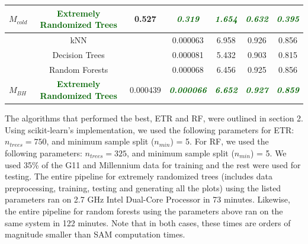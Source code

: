\documentclass[a4paper,fleqn,usenatbib]{mnras}
\begin{document}
\begin{table}
\begin{minipage}{159mm}
\begin{tabular}{@{}lcccccc}
  \multirow{-5}{*}{$M_{cold}$} & \textcolor{darkgreen}{\textbf{Extremely Randomized Trees}} & \multirow{-5}{*}{0.527} & \textcolor{darkgreen}{\textbf{\textit{0.319}}} & \textcolor{darkgreen}{\textbf{\textit{1.654}}} & \textcolor{darkgreen}{\textbf{\textit{0.632}}} & \textcolor{darkgreen}{\textbf{\textit{0.395}}} \\
 \hline
 & kNN & & 0.000063 & 6.958 & 0.926 & 0.856 \\
  & Decision Trees &  & 0.000081 & 5.432 & 0.903 & 0.815 \\
  & Random Forests &  & 0.000068 & 6.456 & 0.925 & 0.856 \\
  \multirow{-5}{*}{$M_{BH}$} & \textcolor{darkgreen}{\textbf{Extremely Randomized Trees}} & \multirow{-5}{*}{0.000439} & \textcolor{darkgreen}{\textbf{\textit{0.000066}}} & \textcolor{darkgreen}{\textbf{\textit{6.652}}} & \textcolor{darkgreen}{\textbf{\textit{0.927}}} & \textcolor{darkgreen}{\textbf{\textit{0.859}}}\\
 \hline
  
 \end{tabular}
 \end{minipage}
\end{table}

\par 
The algorithms that performed the best, ETR and RF, were outlined in section 2. Using scikit-learn's implementation, we used the following parameters for ETR: $n_{trees} = 750$, and minimum sample split ($n_{min}$) = 5. For RF, we used the following parameters: $n_{trees} = 325$, and minimum sample split ($n_{min}$) = 5. We used 35\% of the G11 and Millennium data for training and the rest were used for testing. The entire pipeline for extremely randomized trees (includes data preprocessing, training, testing and generating all the plots) using the listed parameters ran on 2.7 GHz Intel Dual-Core Processor in 73 minutes. Likewise, the entire pipeline for random forests using the parameters above ran on the same system in 122 minutes. Note that in both cases, these times are orders of magnitude smaller than SAM computation times.
\end{document}
